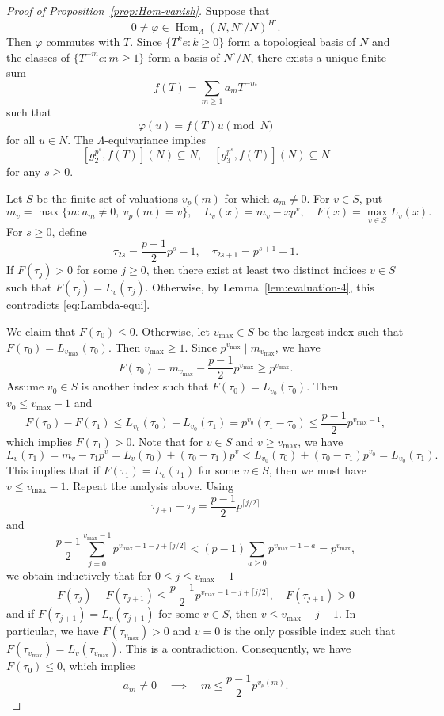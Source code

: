 \documentclass[11pt,a4paper]{article} %
\def\Hom{\operatorname{Hom}}
\def\max{\operatorname{max}}
\begin{document}
\begin{proof}[Proof of Proposition~\ref{prop:Hom-vanish}]
    Suppose that 
    \[
    0\ne\varphi\in\Hom_\Lambda(N,N^\circ/N)^{H'}.
    \]
    Then $\varphi$ commutes with $T$. Since $\{T^ke:k\ge0\}$ form a topological basis of $N$ and the classes of $\{T^{-m}e:m\ge1\}$ form a basis of $N^\circ/N$, there exists a unique finite sum
    \[
    f(T)=\sum_{m\ge1}a_mT^{-m}
    \]
    such that 
    \[
    \varphi(u)=f(T)u\pmod{N}
    \]
    for all $u\in N$. The $\Lambda$-equivariance implies
    \begin{equation}\label{eq:Lambda-equi}
        [g_2^{p^s},f(T)](N)\subseteq N,\quad [g_3^{p^s},f(T)](N)\subseteq N
    \end{equation}
    for any $s\ge0$.
    
    Let $S$ be the finite set of valuations $v_p(m)$ for which $a_m\ne0$. For $v\in S$, put
    \[
    m_v=\max\{m:a_m\ne0,\ v_p(m)=v\},\quad L_v(x)=m_v-xp^v,\quad
    F(x)=\max_{v\in S}L_v(x).
    \]
    For $s\ge0$, define
    \[
    \tau_{2s}=\frac{p+1}{2}p^s-1,\quad \tau_{2s+1}=p^{s+1}-1.
    \]
    If $F(\tau_j)>0$ for some $j\ge0$, then there exist at least two distinct indices $v\in S$ such that $F(\tau_j)=L_v(\tau_j)$. Otherwise, by Lemma~\ref{lem:evaluation-4}, this contradicts \eqref{eq:Lambda-equi}.

    We claim that $F(\tau_0)\le0$. Otherwise, let $v_{\max}\in S$ be the largest index such that $F(\tau_0)=L_{v_{\max}}(\tau_0)$. Then $v_{\max}\ge1$. Since $p^{v_{\max}}\mid m_{v_{\max}}$, we have
    \[
    F(\tau_0)=m_{v_{\max}}-\frac{p-1}{2}p^{v_{\max}}\ge p^{v_{\max}}.
    \]
    Assume $v_0\in S$ is another index such that $F(\tau_0)=L_{v_0}(\tau_0)$. Then $v_0\le v_{\max}-1$ and
    \[
    F(\tau_0)-F(\tau_1)\le L_{v_0}(\tau_0)-L_{v_0}(\tau_1)=p^{v_0}(\tau_1-\tau_0)\le\frac{p-1}{2}p^{v_{\max}-1},
    \]
    which implies $F(\tau_1)>0$. Note that for $v\in S$ and $v\ge v_{\max}$, we have
    \[
    L_v(\tau_1)=m_v-\tau_1p^v=L_v(\tau_0)+(\tau_0-\tau_1)p^v<L_{v_0}(\tau_0)+(\tau_0-\tau_1)p^{v_0}=L_{v_0}(\tau_1).
    \]
    This implies that if $F(\tau_1)=L_v(\tau_1)$ for some $v\in S$, then we must have $v\le v_{\max}-1$. Repeat the analysis above. Using
    \[
    \tau_{j+1}-\tau_j=\frac{p-1}{2}p^{\lceil j/2\rceil}
    \]
    and
    \[
    \frac{p-1}{2}\sum_{j=0}^{v_{\max}-1}p^{v_{\max}-1-j+\lceil j/2\rceil}
    <(p-1)\sum_{a\ge0}p^{v_{\max}-1-a}=p^{v_{\max}},
    \]
    we obtain inductively that for $0\le j\le v_{\max}-1$
    \[
    F(\tau_j)-F(\tau_{j+1})\le\frac{p-1}{2}p^{v_{\max}-1-j+\lceil j/2\rceil},\quad F(\tau_{j+1})>0
    \]
    and if $F(\tau_{j+1})=L_v(\tau_{j+1})$ for some $v\in S$, then $v\le v_{\max}-j-1$. In particular, we have $F(\tau_{v_{\max}})>0$ and $v=0$ is the only possible index such that $F(\tau_{v_{\max}})=L_v(\tau_{v_{\max}})$. This is a contradiction. Consequently, we have $F(\tau_0)\le0$, which implies
    \[
    a_m\ne0\quad\implies\quad
    m\le\frac{p-1}{2}p^{v_p(m)}.
    \]


\end{proof}
\end{document}
